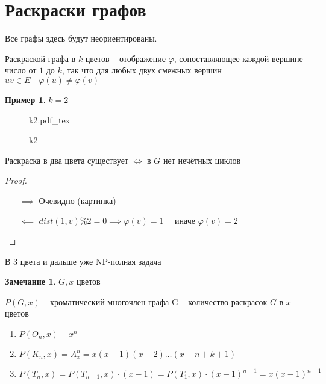 \documentclass{book}
\theoremstyle{definition}
\newtheorem*{note}{Замечание}
\newtheorem*{example}{Пример}
\newcommand{\incfig}[1]{%
    \def\svgwidth{\columnwidth}
    {#1.pdf_tex}
}
\begin{document}
\section{Раскраски графов}

Все графы здесь будут неориентированы.

\begin{definition}
    Раскраской графа в $k$ цветов -- отображение $\varphi$, сопоставляющее каждой вершине число от $1$ до $k$, так что для любых двух смежных вершин  $uv\in E\quad \varphi(u)\neq \varphi(v)$
\end{definition}

\begin{example}
    $k = 2$
\end{example}

\begin{figure}[!ht]
    \centering
    \incfig{k2}
    \caption{k2}
    \label{fig:k2}
\end{figure}

\begin{statement}
    Раскраска в два цвета существует $\iff $ в $G$ нет нечётных циклов
\end{statement}
\begin{proof}
    \begin{itemize}
        \item []
        \item [$\implies $] Очевидно (картинка)
        \item [$\impliedby $] $dist(1,v) \% 2 = 0 \implies \varphi(v) =1\quad$ иначе $\varphi(v) = 2$
    \end{itemize}
\end{proof}

В 3 цвета и дальше уже NP-полная задача

\begin{note}
    $G, x$ цветов

    $P(G, x)$ -- хроматический многочлен графа G --  количество раскрасок  $G$ в  $x$ цветов

     \begin{enumerate}
         \item $P(O_n, x) - x^n$
         \item  $P(K_n, x) = A_x^n = x(x-1)(x-2)\ldots (x-n+k + 1)$ 
         \item $P(T_n, x) = P\left( T_{n-1}, x \right) \cdot (x-1) = P\left( T_1, x \right) \cdot (x-1)^{n-1} = x\left( x-1 \right) ^{n-1}$
    \end{enumerate}
\end{note}
\end{document}
